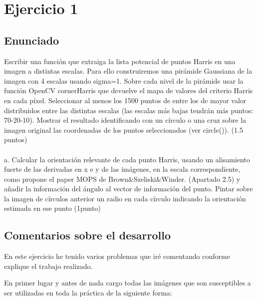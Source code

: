 \newpage %

\tableofcontents %

\listoffigures

\newpage




\section{Ejercicio 1}

\subsection{Enunciado}
 Escribir una función que extraiga la lista potencial de puntos Harris en una imagen a distintas escalas. Para ello construiremos una pirámide Gaussiana de la imagen con 4 escalas usando sigma=1. Sobre cada nivel de la pirámide usar la función OpenCV cornerHarris que devuelve el mapa de valores del criterio Harris en cada píxel. Seleccionar al menos los 1500 puntos de entre los de mayor valor distribuidos entre las distintas escalas (las escalas más bajas tendrán más puntos: 70-20-10). Mostrar el resultado identificando con un círculo o una cruz sobre la imagen original las coordenadas de los puntos seleccionados (ver circle()). (1.5 puntos)\\
 \\
 a. Calcular la orientación relevante de cada punto Harris, usando un alisamiento fuerte de las derivadas en x e y de las imágenes, en la escala correspondiente, como propone el paper MOPS de Brown\&Szeliski\&Winder. (Apartado 2.5) y añadir la información del ángulo al vector de información del punto. Pintar sobre la imagen de círculos anterior un radio en cada círculo indicando la orientación
 estimada en ese punto (1punto)
\subsection{Comentarios sobre el desarrollo}

En este ejercicio he tenido varios problemas que iré comentando conforme explique el trabajo realizado.

En primer lugar y antes de nada cargo todas las imágenes que son susceptibles a ser utilizadas en toda la práctica de la siguiente forma:

